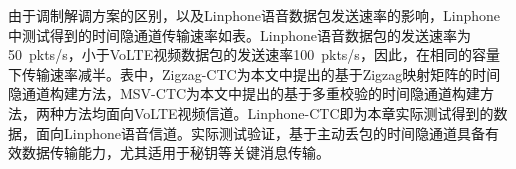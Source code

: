 
由于调制解调方案的区别，以及Linphone语音数据包发送速率的影响，Linphone中测试得到的时间隐通道传输速率如表。Linphone语音数据包的发送速率为{50\ pkts/s}，小于VoLTE视频数据包的发送速率{100\ pkts/s}，因此，在相同的容量下传输速率减半。表中，Zigzag-CTC为本文中提出的基于Zigzag映射矩阵的时间隐通道构建方法，MSV-CTC为本文中提出的基于多重校验的时间隐通道构建方法，两种方法均面向VoLTE视频信道。Linphone-CTC即为本章实际测试得到的数据，面向Linphone语音信道。实际测试验证，基于主动丢包的时间隐通道具备有效数据传输能力，尤其适用于秘钥等关键消息传输。